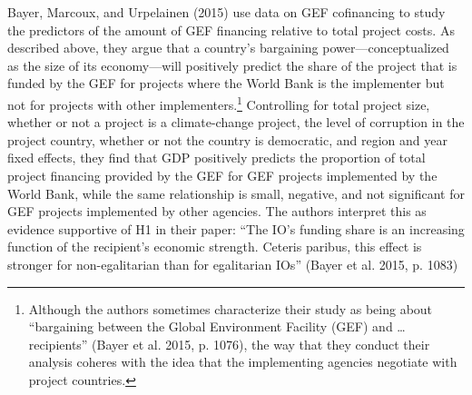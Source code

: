 \documentclass{article}
\begin{document}
Bayer, Marcoux, and Urpelainen (2015) use data on GEF cofinancing to study the predictors of the amount of GEF financing relative to total project costs.  As described above, they argue that a country’s bargaining power---conceptualized as the size of its economy---will positively predict the share of the project that is funded by the GEF for projects where the World Bank is the implementer but not for projects with other implementers.\footnote{Although the authors sometimes characterize their study as being about “bargaining between the Global Environment Facility (GEF) and … recipients” (Bayer et al. 2015, p. 1076), the way that they conduct their analysis coheres with the idea that the implementing agencies negotiate with project countries.} Controlling for total project size, whether or not a project is a climate-change project, the level of corruption in the project country, whether or not the country is democratic, and region and year fixed effects, they find that GDP positively predicts the proportion of total project financing provided by the GEF for GEF projects implemented by the World Bank, while the same relationship is small, negative, and not significant for GEF projects implemented by other agencies.  The authors interpret this as evidence supportive of H1 in their paper: “The IO’s funding share is an increasing function of the recipient’s economic strength.  Ceteris paribus, this effect is stronger for non-egalitarian than for egalitarian IOs” (Bayer et al. 2015, p. 1083)  
\end{document}
